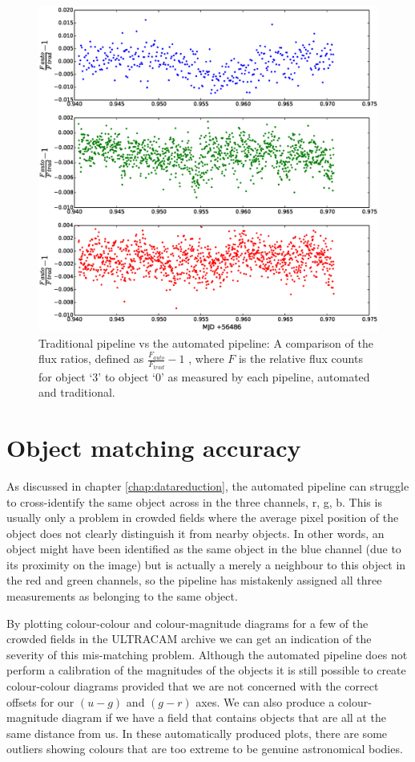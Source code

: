 \begin{figure}
\centering
\includegraphics[width=140mm]{images/ratio-of-ratios.eps}
\caption{Traditional pipeline vs the automated pipeline: A comparison of the flux ratios, defined as $\frac{F_{auto}}{F_{trad}} - 1$ , where $F$ is the relative flux counts for object `3' to object `0' as measured by each pipeline, automated and traditional.}
\label{fig:ratio-of-ratios}
\end{figure}


\section{Object matching accuracy}
As discussed in chapter \ref{chap:datareduction}, the automated pipeline can struggle to cross-identify the same object across in the three channels, r, g, b. This is usually only a problem in crowded fields where the average pixel position of the object does not clearly distinguish it from nearby objects. In other words, an object might have been identified as the same object in the blue channel (due to its proximity on the image) but is actually a merely a neighbour to this object in the red and green channels, so the pipeline has mistakenly assigned all three measurements as belonging to the same object.

By plotting colour-colour and colour-magnitude diagrams for a few of the crowded fields in the ULTRACAM archive we can get an indication of the severity of this mis-matching problem. Although the automated pipeline does not perform a calibration of the magnitudes of the objects it is still possible to create colour-colour diagrams provided that we are not concerned with the correct offsets for our $(u-g)$ and $(g-r)$ axes. We can also produce a colour-magnitude diagram if we have a field that contains objects that are all at the same distance from us. In these automatically produced plots, there are some outliers showing colours that are too extreme to be genuine astronomical bodies. 

